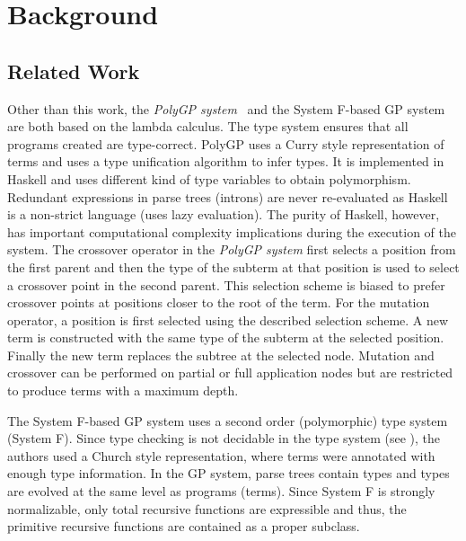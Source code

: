 
\section{Background}
\label{materials-methods}

\subsection{Related Work}
\label{related-work}
\cbstart
Other than this work, the {\it PolyGP system}~\cite{yu1998polygp} and the System F-based GP system \cite{binard2008genetic} are both based on the lambda calculus. The type system ensures that all programs created are type-correct. PolyGP uses a Curry style representation of terms and uses a type unification algorithm to infer types. It is implemented in Haskell and uses different kind of type variables to obtain polymorphism. Redundant expressions in parse trees (introns) are never re-evaluated as Haskell is a non-strict language (uses lazy evaluation). The purity of Haskell, however, has important computational complexity implications during the execution of the system. The crossover operator in the {\it PolyGP system} first selects a position from the first parent and then the type of the subterm at that position is used to select a crossover point in the second parent. This selection scheme is biased to prefer crossover points at positions closer to the root of the term. For the mutation operator, a position is first selected using the described selection scheme. A new term is constructed with the same type of the subterm at the selected position. Finally the new term replaces the subtree at the selected node. Mutation and crossover can be performed on partial or full application nodes but are restricted to produce terms with a maximum depth.

The System F-based GP system \cite{binard2008genetic} uses a second order (polymorphic) type system (System F). Since type checking is not decidable in the type system (see \cite{wells1999typability}), the authors used a Church style representation, where terms were annotated with enough type information. In the GP system, parse trees contain types and types are evolved at the same level as programs (terms). Since System F is strongly normalizable, only total recursive functions are expressible and thus, the primitive recursive functions are contained as a proper subclass.

